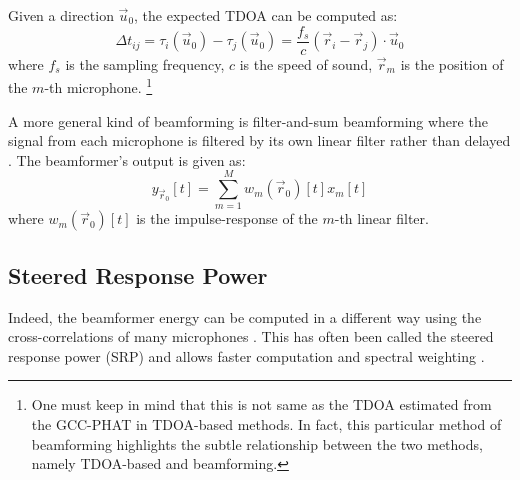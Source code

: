 \documentclass[notitlepage]{report}
\begin{document}
Given a direction $\vec{u}_0$, the expected TDOA can be computed as:
\begin{equation}
\Delta t_{ij} = \tau_{i}(\vec{u}_0) - \tau_{j}(\vec{u}_0) = \frac{f_s}{c} \left( \vec{r}_i - \vec{r}_j \right) \cdot \vec{u}_0
\end{equation}
where $f_s$ is the sampling frequency, $c$ is the speed of sound, $\vec{r}_m$ is the position of the $m$-th microphone. \footnote{One must keep in mind that this is not same as the TDOA estimated from the GCC-PHAT in TDOA-based methods. In fact, this particular method of beamforming highlights the subtle relationship between the two methods, namely TDOA-based and beamforming.}

A more general kind of beamforming is filter-and-sum beamforming where the signal from each microphone is filtered by its own linear filter rather than delayed \cite{argentieri_survey_2015}. The beamformer's output is given as:
\begin{equation}
y_{\vec{r}_0}[t] = \sum_{m=1}^M w_m(\vec{r}_0)[t]x_m[t]
\end{equation} 
where $w_m(\vec{r}_0)[t]$ is the impulse-response of the $m$-th linear filter.

\subsection{Steered Response Power}

Indeed, the beamformer energy can be computed in a different way using the cross-correlations of many microphones \cite{valin_localization_2004} \cite{valin_robust_2007} \cite{argentieri_survey_2015} \cite{rascon_localization_2017}. This has often been called the steered response power (SRP) and allows faster computation and spectral weighting \cite{badali_evaluating_2009}. 
\end{document}
